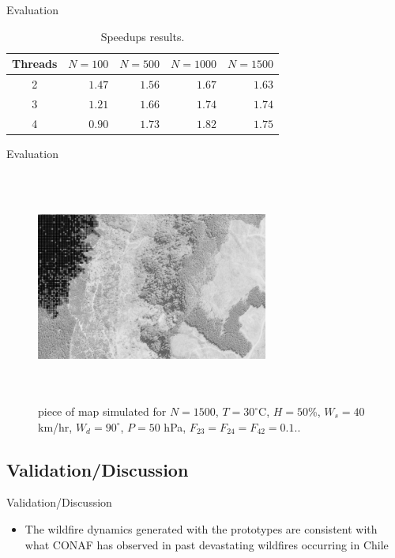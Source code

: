 \documentclass{beamer}
\begin{document}
        \begin{frame}{Evaluation}
            \begin{table}[!ht]
            \renewcommand{\arraystretch}{1.3}
            \centering
            \caption{Speedups results.}
            \label{tab:speedups}
            \begin{tabular}{c||rrrr}
                \hline
                Threads & $N=100$ & $N=500$ & $N=1000$ & $N=1500$ \\ \hline\hline
                2       & $1.47$ & $1.56$ & $1.67$ & $1.63$ \\
                3       & $1.21$ & $1.66$ & $1.74$ & $1.74$ \\
                4       & $0.90$ & $1.73$ & $1.82$ & $1.75$  
            \end{tabular}
        \end{table}
        \end{frame}
        
        \begin{frame}{Evaluation}
            \begin{figure}[!ht]
                \centering
                \includegraphics[width=3in,height=3in,clip,keepaspectratio]{img/simulation_gray.png}
                \caption{piece of map simulated for $N=1500$, $T=30^{\circ}$C, $H=50$\%, 
                    $W_s=40$ km/hr, $W_d=90^{\circ}$, $P=50$ hPa, $F_{23} = F_{24}= F_{42} = 0.1$..}
                \label{fig:simulation}
            \end{figure}
        \end{frame}
    
        \subsection{Validation/Discussion}
        \begin{frame}{Validation/Discussion}
            \begin{itemize}
                \item<1-> The wildfire dynamics generated with the prototypes are consistent with what 
                    CONAF has observed in past devastating wildfires occurring in Chile
            \end{itemize}
        \end{frame}
        
\end{document}
